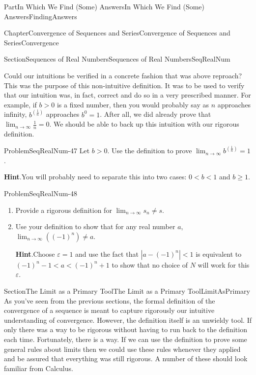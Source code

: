 \documentclass[oneside,10pt,]{book}
\newcommand{\blocktitlefont}{\relax}
\numberwithin{equation}{part}
\newcommand{\abs}[1]{\left|#1\right|}
\def\limitt#1#2#3{{\displaystyle\lim_{#1\rightarrow #2}\textstyle #3}}
\newcommand{\eps}{\varepsilon}
\newcommand{\lt}{<}
\begin{document}
\begin{partptx}{Part}{In Which We Find (Some) Answers}{}{In Which We Find (Some) Answers}{}{}{FindingAnswers}
\begin{chapterptx}{Chapter}{Convergence of Sequences and Series}{}{Convergence of Sequences and Series}{}{}{Convergence}
\begin{sectionptx}{Section}{Sequences of Real Numbers}{}{Sequences of Real Numbers}{}{}{SeqRealNum}
\par
Could our intuitions be verified in a concrete fashion that was above reproach? This was the purpose of this non-intuitive definition. It was to be used to verify that our intuition was, in fact, correct and do so in a very prescribed manner. For example, if \(b>0\) is a fixed number, then you would probably say as \(n\) approaches infinity, \(b^{\left(\frac{1}{n}\right)}\) approaches \(b^0=1\). After all, we did already prove that \(\lim_{n\rightarrow\infty}\frac{1}{n}=0\). We should be able to back up this intuition with our rigorous definition.%
\begin{problem}{Problem}{}{SeqRealNum-47}%
 Let \(b>0\). Use the definition to prove \(\limitt{n}{\infty}{b^{\left(\frac{1}{n}\right)}}=1\).%
\par\smallskip%
\noindent\textbf{\blocktitlefont Hint}.\hypertarget{SeqRealNum-47-2}{}\quad{}You will probably need to separate this into two cases: \(0\lt b\lt 1\) and \(b\geq 1\).%
\end{problem}
\begin{problem}{Problem}{}{SeqRealNum-48}%
\begin{enumerate}[font=\bfseries,label=(\alph*),ref=\alph*]%
\item{}Provide a rigorous definition for \(\limitt{n}{\infty}{s_n}\neq s\).%
\item{}Use your definition to show that for any real number \(a\), \(\limitt{n}{\infty}{\left(\left(-1\right)^n\right)}\neq a\).%
\par\smallskip%
\noindent\textbf{\blocktitlefont Hint}.\hypertarget{SeqRealNum-48-4-2}{}\quad{}Choose \(\eps=1\) and use the fact that \(\abs{a-(-1)^n}\lt 1\) is equivalent to \(\left(-1\right)^n-1\lt a\lt \left(-1\right)^n+1\) to show that no choice of \(N\) will work for this \(\eps\).%
\end{enumerate}%
\end{problem}
\end{sectionptx}
%
%
\typeout{************************************************}
\typeout{************************************************}
%
\begin{sectionptx}{Section}{The Limit as a Primary Tool}{}{The Limit as a Primary Tool}{}{}{LimitAsPrimary}
As you've seen from the previous sections, the formal definition of the convergence of a sequence is meant to capture rigorously our intuitive understanding of convergence.  However, the definition itself is an unwieldy tool.  If only there was a way to be rigorous without having to run back to the definition each time.  Fortunately, there is a way.  If we can use the definition to prove some general rules about limits then we could use these rules whenever they applied and be assured that everything was still rigorous.  A number of these should look familiar from Calculus.%

\end{sectionptx}
\end{chapterptx}
\end{partptx}
\end{document}
